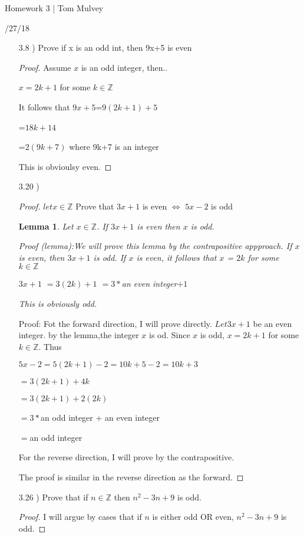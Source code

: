 \documentclass[12pt]{article}
\newcommand{\Z}{\mathbb Z}
\newtheorem{lem}[thm]{Lemma}
\begin{document}
\centerline{\sc \large Homework 3 | Tom Mulvey }

\centerline{/27/18}

\vspace{2pc}

\begin{enumerate}

\item[3.8] ) Prove if x is an odd int, then 9x+5 is even
   \begin{proof}  
      Assume $x$ is an odd integer, then..

      $x=2k+1$ for some $k \in \Z$
      
      It follows that $9x+5$=$9(2k+1)+5$

      =$18k+14$

      =$2(9k+7)$ where 9k+7 is an integer

      This is obvioulsy even.
   \end{proof}
\item[3.20] )
   \begin{proof} $let x\in \Z$ Prove that $3x+1$ is even $\iff$ $5x-2$ is odd
	
      \begin{lem}
         Let $x \in \Z$. If $3x+1$ is even then $x$ is odd.


	 Proof (lemma):We will prove this lemma by the contrapositive appproach. If $x$ is even, then $3x+1$ is odd. If $x$ is even, it follows that $x$ = $2k$ for some $k \in \Z$ 


         $3x+1$ $=3(2k) +1$ $=3*$an even integer$ +1$

	 This is obviously odd.
      \end{lem}	
      Proof: Fot the forward direction, I will prove directly. $Let 3x+1$ be an even integer. by the lemma,the integer $x$ is od. Since $x$ is odd, $x=2k+1$ for some $k \in \Z$. Thus

      $5x-2=5(2k+1)-2=10k+5-2=10k+3$
      
      $=3(2k+1) + 4k$

      $=3(2k+1) + 2(2k)$

      $=3*$an odd integer + an even integer

      $=$an odd integer

       For the reverse direction, I will prove by the contrapositive. 

       The proof is similar in the reverse direction as the forward.
   \end{proof}
\item[3.26] ) Prove that if $n \in \Z$ then $n^2 -3n +9$ is odd.
   \begin{proof}
      I will argue by cases that if $n$ is either odd OR even, $n^2 -3n +9$ is odd.



\end{proof}
\end{enumerate}
\end{document}
